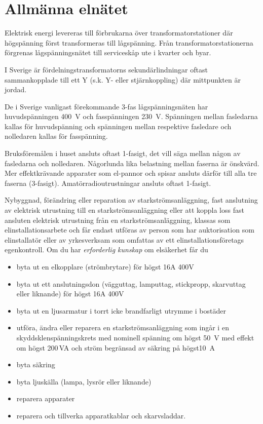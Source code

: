 \section{Allmänna elnätet}
\label{jordning}

Elektrisk energi levereras till förbrukarna över transformatorstationer där
högspänning först transformeras till lågspänning.
Från transformatorstationerna förgrenas lågspänningsnätet till serviceskåp ute
i kvarter och byar.

I Sverige är fördelningstransformatorns sekundärlindningar oftast sammankopplade
till ett Y (s.k. Y- eller stjärnkoppling) där mittpunkten är jordad.

De i Sverige vanligast förekommande 3-fas lågspänningsnäten har huvudspänningen
\SI{400}{\volt} och fasspänningen \SI{230}{\volt}.
Spänningen mellan fasledarna kallas för huvudspänning och spänningen mellan
respektive fasledare och nolledaren kallas för fasspänning.

Bruksföremålen i huset ansluts oftast 1-fasigt, det vill säga mellan någon av
fasledarna och nolledaren.
Någorlunda lika belastning mellan faserna är önskvärd.
Mer effektkrävande apparater som el-pannor och spisar ansluts därför till alla
tre faserna (3-fasigt).
Amatörradioutrustningar ansluts oftast 1-fasigt.

Nybyggnad, förändring eller reparation av starkströmsanläggning,
fast anslutning av elektrisk utrustning till en starkströmsanläggning
eller att koppla loss fast ansluten elektrisk utrustning från en
starkströmsanläggning, klassas som elinstallationsarbete och får endast
utföras av person som har auktorisation som elinstallatör eller av
yrkesverksam som omfattas av ett elinstallationsföretags egenkontroll.
Om du har \emph{erforderlig kunskap} om elsäkerhet får du

\begin{itemize}
\item byta ut en elkopplare (strömbrytare) för högst 16A 400V
\item byta ut ett anslutningsdon (vägguttag, lamputtag, stickpropp,
skarvuttag eller liknande) för högst 16A 400V
\item byta ut en ljusarmatur i torrt icke brandfarligt utrymme i bostäder
\item utföra, ändra eller reparera en starkströmsanläggning som ingår i en
skyddsklenspänningskrets med nominell spänning om högst \SI{50}{\volt} med
effekt om högst 200\,VA och ström begränsad av säkring på högst\SI{10}{\ampere}
\item byta säkring
\item byta ljuskälla (lampa, lysrör eller liknande)
\item reparera apparater
\item reparera och tillverka apparatkablar och skarvsladdar.
\end{itemize}

